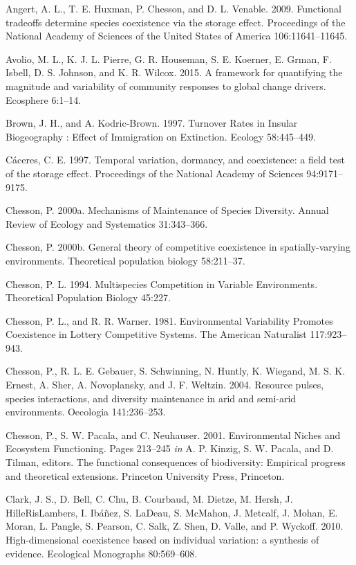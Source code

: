 \documentclass[12pt,]{article}
\begin{document}
Angert, A. L., T. E. Huxman, P. Chesson, and D. L. Venable. 2009.
Functional tradeoffs determine species coexistence via the storage
effect. Proceedings of the National Academy of Sciences of the United
States of America 106:11641--11645.

Avolio, M. L., K. J. L. Pierre, G. R. Houseman, S. E. Koerner, E. Grman,
F. Isbell, D. S. Johnson, and K. R. Wilcox. 2015. A framework for
quantifying the magnitude and variability of community responses to
global change drivers. Ecosphere 6:1--14.

Brown, J. H., and A. Kodric-Brown. 1997. Turnover Rates in Insular
Biogeography : Effect of Immigration on Extinction. Ecology 58:445--449.

C{á}ceres, C. E. 1997. Temporal variation, dormancy, and coexistence: a
field test of the storage effect. Proceedings of the National Academy of
Sciences 94:9171--9175.

Chesson, P. 2000a. Mechanisms of Maintenance of Species Diversity.
Annual Review of Ecology and Systematics 31:343--366.

Chesson, P. 2000b. General theory of competitive coexistence in
spatially-varying environments. Theoretical population biology
58:211--37.

Chesson, P. L. 1994. Multispecies Competition in Variable Environments.
Theoretical Population Biology 45:227.

Chesson, P. L., and R. R. Warner. 1981. Environmental Variability
Promotes Coexistence in Lottery Competitive Systems. The American
Naturalist 117:923--943.

Chesson, P., R. L. E. Gebauer, S. Schwinning, N. Huntly, K. Wiegand, M.
S. K. Ernest, A. Sher, A. Novoplansky, and J. F. Weltzin. 2004. Resource
pulses, species interactions, and diversity maintenance in arid and
semi-arid environments. Oecologia 141:236--253.

Chesson, P., S. W. Pacala, and C. Neuhauser. 2001. Environmental Niches
and Ecosystem Functioning. Pages 213--245 \emph{in} A. P. Kinzig, S. W.
Pacala, and D. Tilman, editors. The functional consequences of
biodiversity: Empirical progress and theoretical extensions. Princeton
University Press, Princeton.

Clark, J. S., D. Bell, C. Chu, B. Courbaud, M. Dietze, M. Hersh, J.
HilleRisLambers, I. Ib{á}{ñ}ez, S. LaDeau, S. McMahon, J. Metcalf, J.
Mohan, E. Moran, L. Pangle, S. Pearson, C. Salk, Z. Shen, D. Valle, and
P. Wyckoff. 2010. High-dimensional coexistence based on individual
variation: a synthesis of evidence. Ecological Monographs 80:569--608.
\end{document}
